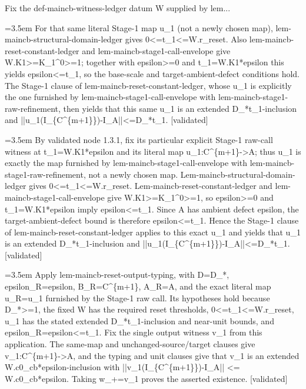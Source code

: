 \documentclass{article}
\newcommand{\step}[1]{\par\noindent\hangindent=3.5em\hangafter=1%
  \makebox[3.5em][l]{\textbf{#1.}}}
\newcommand{\steptag}[1]{\hfill{\small\textsf{[#1]}}}
\begin{document}
\begin{proofbox}{Fix the def-maincb-witness-ledger datum W supplied by lem...}
\step{1.3.2} For that same literal Stage-1 map u\_1 (not a newly chosen map), lem-maincb-structural-domain-ledger gives 0<=t\_1<=W.r\_reset. Also lem-maincb-reset-constant-ledger and lem-maincb-stage1-call-envelope give W.K1>=K\_1\textasciicircum{}0>=1; together with epsilon>=0 and t\_1=W.K1*epsilon this yields epsilon<=t\_1, so the base-scale and target-ambient-defect conditions hold. The Stage-1 clause of lem-maincb-reset-constant-ledger, whose u\_1 is explicitly the one furnished by lem-maincb-stage1-call-envelope with lem-maincb-stage1-raw-refinement, then yields that this same u\_1 is an extended D\_*t\_1-inclusion and ||u\_1(I\_\{C\textasciicircum{}\{m+1\}\})-I\_A||<=D\_*t\_1. \steptag{validated} \\[6pt]
\step{1.3.2.1} By validated node 1.3.1, fix its particular explicit Stage-1 raw-call witness at t\_1=W.K1*epsilon and its literal map u\_1:C\textasciicircum{}\{m+1\}->A; thus u\_1 is exactly the map furnished by lem-maincb-stage1-call-envelope with lem-maincb-stage1-raw-refinement, not a newly chosen map. Lem-maincb-structural-domain-ledger gives 0<=t\_1<=W.r\_reset. Lem-maincb-reset-constant-ledger and lem-maincb-stage1-call-envelope give W.K1>=K\_1\textasciicircum{}0>=1, so epsilon>=0 and t\_1=W.K1*epsilon imply epsilon<=t\_1. Since A has ambient defect epsilon, the target-ambient-defect bound is therefore epsilon<=t\_1. Hence the Stage-1 clause of lem-maincb-reset-constant-ledger applies to this exact u\_1 and yields that u\_1 is an extended D\_*t\_1-inclusion and ||u\_1(I\_\{C\textasciicircum{}\{m+1\}\})-I\_A||<=D\_*t\_1. \steptag{validated} \\[4pt]
\step{1.4} Apply lem-maincb-reset-output-typing, with D=D\_*, epsilon\_R=epsilon, B\_R=C\textasciicircum{}\{m+1\}, A\_R=A, and the exact literal map u\_R=u\_1 furnished by the Stage-1 raw call. Its hypotheses hold because D\_*>=1, the fixed W has the required reset thresholds, 0<=t\_1<=W.r\_reset, u\_1 has the stated extended D\_*t\_1-inclusion and near-unit bounds, and epsilon\_R=epsilon<=t\_1. Fix the single output witness v\_1 from this application. The same-map and unchanged-source/target clauses give v\_1:C\textasciicircum{}\{m+1\}->A, and the typing and unit clauses give that v\_1 is an extended W.c0\_cb*epsilon-inclusion with ||v\_1(I\_\{C\textasciicircum{}\{m+1\}\})-I\_A|| <= W.c0\_cb*epsilon. Taking w\_+=v\_1 proves the asserted existence. \steptag{validated} \\[4pt]
\end{proofbox}
\end{document}
